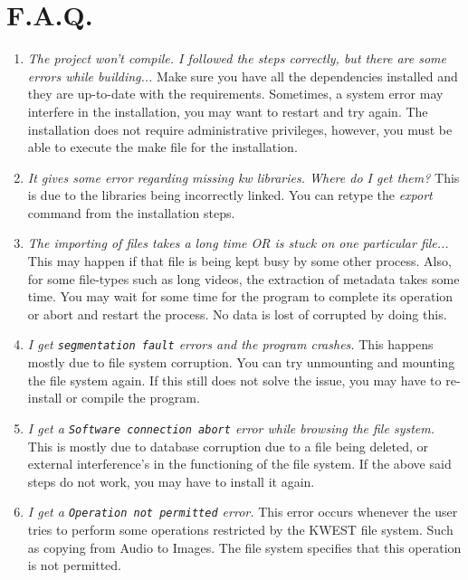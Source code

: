 \section{F.A.Q.}
\begin{enumerate} 
\item \emph{The project won't compile. I followed the steps correctly, but there are some errors while building...} \newline
Make sure you have all the dependencies installed and they are up-to-date with the requirements. Sometimes, a system error may interfere in the installation, you may want to restart and try again. The installation does not require administrative privileges, however, you must be able to execute the make file for the installation.
\item \emph{It gives some error regarding missing kw libraries. Where do I get them?} \newline
This is due to the libraries being incorrectly linked. You can retype the \textit{export} command from the installation steps.
\item \emph{The importing of files takes a long time OR is stuck on one particular file...} \newline
This may happen if that file is being kept busy by some other process. Also, for some file-types such as long videos, the extraction of metadata takes some time. You may wait for some time for the program to complete its operation or abort and restart the process. No data is lost of corrupted by doing this.
\item \emph{I get \texttt{segmentation fault} errors and the program crashes.} \newline
This happens mostly due to file system corruption. You can try unmounting and mounting the file system again. If this still does not solve the issue, you may have to re-install or compile the program.
\item \emph{I get a \texttt{Software connection abort} error while browsing the file system.} \newline
This is mostly due to database corruption due to a file being deleted, or external interference's in the functioning of the file system. If the above said steps do not work, you may have to install it again.
\item \emph{I get a \texttt{Operation not permitted} error.} \newline
This error occurs whenever the user tries to perform some operations restricted by the KWEST file system. Such as copying from Audio to Images. The file system specifies that this operation is not permitted.

\end{enumerate}
